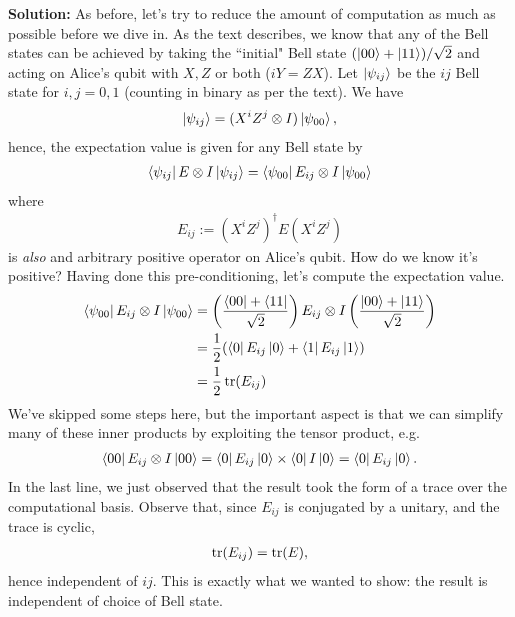 \documentclass{book}
\begin{document}
    \textbf{Solution:} As before, let's try to reduce the amount of computation as much as possible before we dive in. As the text describes, we know that any of the Bell states can be achieved by taking the ``initial" Bell state $(\ket{00}+\ket{11})/\sqrt{2}$ and acting on Alice's qubit with $X, Z$ or both ($iY = ZX$). Let $\ket{\psi_{ij}}$ be the $ij$ Bell state for $i, j = 0,1$ (counting in binary as per the text). We have
    \begin{align}
        \ket{\psi_{ij}} = (X^i Z^j \otimes I) \ket{\psi_{00}},
    \end{align}
    hence, the expectation value is given for any Bell state by
    \begin{align}
        \bra{\psi_{ij}} E\otimes  I \ket{\psi_{ij}} = \bra{\psi_{00}} E_{ij} \otimes I \ket{\psi_{00}}
    \end{align}
    where
    \begin{align}
        E_{ij} := (X^i Z^j)^\dagger E (X^i Z^j)
    \end{align}
    is \emph{also} and arbitrary positive operator on Alice's qubit. How do we know it's positive? Having done this pre-conditioning, let's compute the expectation value.
    \begin{align}
    \begin{aligned}
        \bra{\psi_{00}} E_{ij}\otimes I \ket{\psi_{00}} &= \left(\frac{\bra{00}+\bra{11}}{\sqrt{2}}\right) E_{ij} \otimes I\left(\frac{\ket{00} + \ket{11}}{\sqrt{2}}\right) \\
        &=\frac{1}{2} (\bra{0}E_{ij} \ket{0} + \bra{1}E_{ij} \ket{1}) \\
        &= \frac{1}{2} \tr(E_{ij})
    \end{aligned}
    \end{align}
    We've skipped some steps here, but the important aspect is that we can simplify many of these inner products by exploiting the tensor product, e.g.
    \begin{align}  
        \bra{00}E_{ij} \otimes I \ket{00} = \bra{0}E_{ij}\ket{0} \times \bra{0} I \ket{0} = \bra{0}E_{ij}\ket{0}.
    \end{align}
    In the last line, we just observed that the result took the form of a trace over the computational basis. Observe that, since $E_{ij}$ is conjugated by a unitary, and the trace is cyclic,
    \begin{align}
        \tr (E_{ij}) = \tr (E),
    \end{align}
    hence independent of $ij$. This is exactly what we wanted to show: the result is independent of choice of Bell state.
\end{document}
